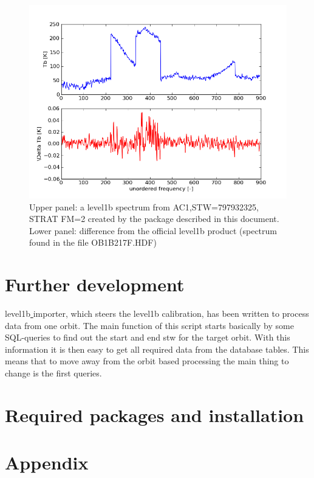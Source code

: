 \documentclass[12pt]{article}
\begin{document}
\begin{figure}[!t]
\centering
\includegraphics[scale=0.7]{spectrum.png}
\caption{Upper panel: a level1b spectrum from AC1,STW=797932325,
STRAT FM=2 created by the package described in this document.
Lower panel: difference from the official level1b product
(spectrum found in the file OB1B217F.HDF) }
\label{fig:odin1}
\end{figure}



\section{Further development}
level1b\underline{ }importer, which steers the level1b
calibration, has been written to process data from one orbit.
The main function of this script starts basically by some
SQL-queries to find out the start and end stw for the target orbit.
With this information it is then easy to get all required
data from the database tables.
This means that to move away from the orbit based processing
the main thing to change is the first queries.



\section{Required packages and installation}

\section{Appendix}
\end{document}
